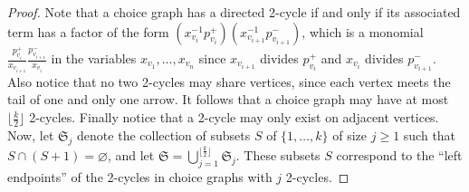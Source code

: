\documentclass[10pt]{amsart}
\numberwithin{equation}{section}
\theoremstyle{definition}
\theoremstyle{remark}
\renewcommand{\emptyset}{\varnothing}
\newcommand{\1}{^{-1}}
\begin{document}
\begin{proof}
 Note that a choice graph has a directed 2-cycle if and only if its associated term has a factor of the form $(x_{v_i}\1 p_{v_i}^+)(x_{v_{i+1}}\1 p_{v_{i+1}}^-)$, which is a monomial $\frac{p_{v_i}^+}{x_{v_{i+1}}} \frac{p_{v_{i+1}}^-}{x_{v_i}}$ in the variables $x_{v_1},\dots,x_{v_n}$ since $x_{v_{i+1}}$ divides $p_{v_i}^+$ and $x_{v_i}$ divides $p_{v_{i+1}}^-$.
Also notice that no two 2-cycles may share vertices, since each vertex
meets the tail of one and only one arrow. It follows that a choice
graph may have at most $\lfloor \frac k2 \rfloor$ 2-cycles. Finally
notice that a 2-cycle may only exist on adjacent vertices. Now, let
$\mathfrak S_j$ denote the collection of subsets $S$ of
$\{1,\dots,k\}$ of size $j\geq1$ such that $S \cap (S+1) = \emptyset$,
and let $\mathfrak S = \bigcup_{j=1}^{\lfloor \frac k2 \rfloor}
\mathfrak S_j$. These subsets $S$ correspond to the ``left endpoints''
of the 2-cycles in choice graphs with $j$ 2-cycles.

\pagebreak


\end{proof}
\end{document}
